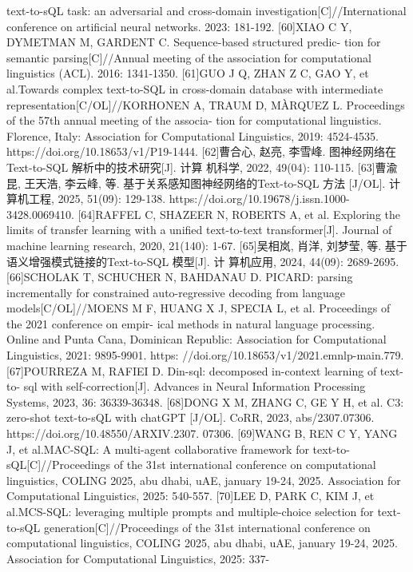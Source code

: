 \documentclass[12pt,a4paper,openright,UTF8]{ctexbook}
\begin{document}
text-to-sQL task: an adversarial and cross-domain investigation[C]//International
conference on artificial neural networks. 2023: 181-192.
[60]XIAO C Y, DYMETMAN M, GARDENT C. Sequence-based structured predic-
tion for semantic parsing[C]//Annual meeting of the association for computational
linguistics (ACL). 2016: 1341-1350.
[61]GUO J Q, ZHAN Z C, GAO Y, et al.Towards complex text-to-SQL in
cross-domain database with intermediate representation[C/OL]//KORHONEN A,
TRAUM D, MÀRQUEZ L. Proceedings of the 57th annual meeting of the associa-
tion for computational linguistics. Florence, Italy: Association for Computational
Linguistics, 2019: 4524-4535. https://doi.org/10.18653/v1/P19-1444.
[62]曹合心, 赵亮, 李雪峰. 图神经网络在Text-to-SQL 解析中的技术研究[J]. 计算
机科学, 2022, 49(04): 110-115.
[63]曹渝昆, 王天浩, 李云峰, 等. 基于关系感知图神经网络的Text-to-SQL 方法
[J/OL]. 计算机工程, 2025, 51(09): 129-138. https://doi.org/10.19678/j.issn.1000-
3428.0069410.
[64]RAFFEL C, SHAZEER N, ROBERTS A, et al. Exploring the limits of transfer
learning with a unified text-to-text transformer[J]. Journal of machine learning
research, 2020, 21(140): 1-67.
[65]吴相岚, 肖洋, 刘梦莹, 等. 基于语义增强模式链接的Text-to-SQL 模型[J]. 计
算机应用, 2024, 44(09): 2689-2695.
[66]SCHOLAK T, SCHUCHER N, BAHDANAU D. PICARD: parsing incrementally
for constrained auto-regressive decoding from language models[C/OL]//MOENS
M F, HUANG X J, SPECIA L, et al. Proceedings of the 2021 conference on empir-
ical methods in natural language processing. Online and Punta Cana, Dominican
Republic: Association for Computational Linguistics, 2021: 9895-9901. https:
//doi.org/10.18653/v1/2021.emnlp-main.779.
[67]POURREZA M, RAFIEI D. Din-sql: decomposed in-context learning of text-to-
sql with self-correction[J]. Advances in Neural Information Processing Systems,
2023, 36: 36339-36348.
[68]DONG X M, ZHANG C, GE Y H, et al. C3: zero-shot text-to-sQL with chatGPT
[J/OL]. CoRR, 2023, abs/2307.07306. https://doi.org/10.48550/ARXIV.2307.
07306.
[69]WANG B, REN C Y, YANG J, et al.MAC-SQL: A multi-agent collaborative
framework for text-to-sQL[C]//Proceedings of the 31st international conference on
computational linguistics, COLING 2025, abu dhabi, uAE, january 19-24, 2025.
Association for Computational Linguistics, 2025: 540-557.
[70]LEE D, PARK C, KIM J, et al.MCS-SQL: leveraging multiple prompts and
multiple-choice selection for text-to-sQL generation[C]//Proceedings of the 31st
international conference on computational linguistics, COLING 2025, abu dhabi,
uAE, january 19-24, 2025. Association for Computational Linguistics, 2025: 337-
\end{document}
